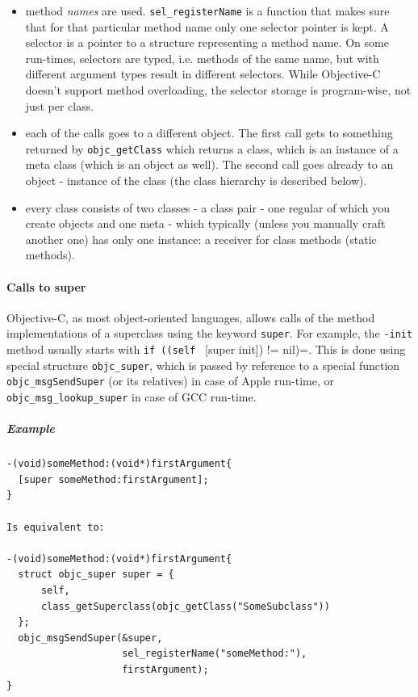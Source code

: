 \begin{itemize}
\item method \emph{names} are used. \verb=sel_registerName= is a function that makes sure that for that particular method name only one selector pointer is kept. A selector is a pointer to a structure representing a method name. On some run-times, selectors are typed, i.e. methods of the same name, but with different argument types result in different selectors. While Objective-C doesn't support method overloading, the selector storage is program-wise, not just per class.
\item each of the calls goes to a different object. The first call gets to something returned by \verb=objc_getClass= which returns a class, which is an instance of a meta class (which is an object as well). The second call goes already to an object - instance of the class (the class hierarchy is described below).
\item every class consists of two classes - a class pair - one regular of which you create objects and one meta - which typically (unless you manually craft another one) has only one instance: a receiver for class methods (static methods).
\end{itemize}

\paragraph{Calls to super}

Objective-C, as most object-oriented languages, allows calls of the method implementations of a superclass using the keyword \verb=super=. For example, the \verb=-init= method usually starts with \verb=if ((self = [super init]) != nil)=. This is done using special structure \verb=objc_super=, which is passed by reference to a special function \verb=objc_msgSendSuper= (or its relatives) in case of Apple run-time, or \verb=objc_msg_lookup_super= in case of GCC run-time.

\subparagraph{Example}

\begin{verbatim}
-(void)someMethod:(void*)firstArgument{
  [super someMethod:firstArgument];
}

Is equivalent to:

-(void)someMethod:(void*)firstArgument{
  struct objc_super super = { 
      self, 
      class_getSuperclass(objc_getClass("SomeSubclass")) 
  };
  objc_msgSendSuper(&super, 
                    sel_registerName("someMethod:"), 
                    firstArgument);
}
\end{verbatim}


